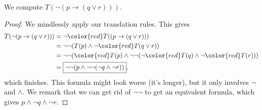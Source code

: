 \begin{exe}
	We compute $T(\lnot(p\to(q\lor r)))$.
\end{exe}
\begin{proof}
	We mindlessly apply our translation rules. This gives
	\begin{align*}
		T(\lnot(p\to(q\lor r))) &= \lnot {\color{red}T((p\to(q\lor r)))} \\
		&= \lnot\lnot(T(p)\land\lnot {\color{red}T(q\lor r)}) \\
		&= \lnot\lnot({\color{red}T(p)}\land\lnot\lnot(\lnot {\color{red}T(q)}\land\lnot {\color{red}T(r)})) \\
		&= \boxed{\lnot\lnot(p\land\lnot\lnot(\lnot q\land\lnot r))},
	\end{align*}
	which finishes. This formula might look worse (it's longer), but it only involves $\lnot$ and $\land$. We remark that we can get rid of $\lnot\lnot$ to get an equivalent formula, which gives $p\land\lnot q\land\lnot r$.
\end{proof}

